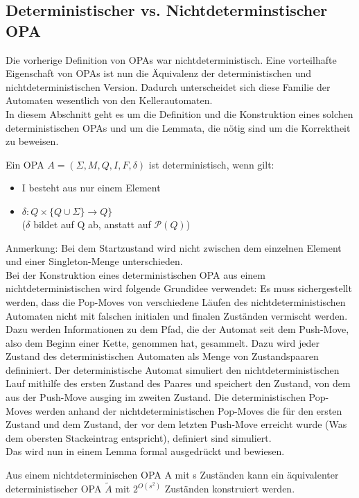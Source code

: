 \subsection{Deterministischer vs. Nichtdeterminstischer OPA}
Die vorherige Definition von OPAs war nichtdeterministisch. Eine vorteilhafte Eigenschaft von OPAs ist nun die Äquivalenz der deterministischen und nichtdeterministischen Version. Dadurch unterscheidet sich diese Familie der Automaten wesentlich von den Kellerautomaten. \\
In diesem Abschnitt geht es um die Definition und die Konstruktion eines solchen deterministischen OPAs und um die Lemmata, die nötig sind um die Korrektheit zu beweisen. \cite{precedence_automata}
\begin{definition}
Ein OPA $A=(\Sigma, M, Q, I, F, \delta)$ ist deterministisch, wenn gilt:
\begin{itemize}
\item
I besteht aus nur einem Element 
\item
$\delta: Q \times \{Q \cup \Sigma\} \rightarrow Q\}$ \\
($\delta$ bildet auf Q ab, anstatt auf $\mathcal{P}(Q)$)
\end{itemize}
\end{definition}
Anmerkung: Bei dem Startzustand wird nicht zwischen dem einzelnen Element und einer Singleton-Menge unterschieden.\\
Bei der Konstruktion eines deterministischen OPA aus einem nichtdeterministischen wird folgende Grundidee verwendet: Es muss sichergestellt werden, dass die Pop-Moves von verschiedene Läufen des nichtdeterministischen Automaten nicht mit falschen initialen und finalen Zuständen vermischt werden. Dazu werden Informationen zu dem Pfad, die der Automat seit dem Push-Move, also dem Beginn einer Kette, genommen hat, gesammelt. Dazu wird jeder Zustand des deterministischen Automaten als Menge von Zustandspaaren defininiert. Der deterministische Automat simuliert den nichtdeterministischen Lauf mithilfe des ersten Zustand des Paares und speichert den Zustand, von dem aus der Push-Move ausging im zweiten Zustand. Die deterministischen Pop-Moves werden anhand  der nichtdeterministischen Pop-Moves die für den ersten Zustand und dem Zustand, der vor dem letzten Push-Move erreicht wurde (Was dem obersten Stackeintrag entspricht), definiert sind simuliert.\\
Das wird nun in einem Lemma formal ausgedrückt und bewiesen.
\begin{lemma}
\label{lemma_Deter}
Aus einem nichtdeterminischen OPA A mit s Zuständen kann ein äquivalenter deterministischer OPA $\tilde{A}$ mit $2^{O(s^2)}$ Zuständen konstruiert werden.
\end{lemma}
